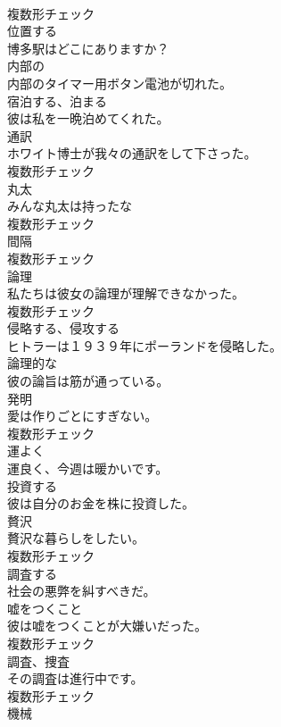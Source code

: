 \documentclass[8pt]{extreport}
\begin{document}
\begin{CJK}{UTF8}{min}
\\	複数形チェック
\\	[動詞]	位置する	
\\	博多駅はどこにありますか？	
\\	[形容詞]	内部の	
\\	内部のタイマー用ボタン電池が切れた。	
\\	[動詞]	宿泊する、泊まる	
\\	彼は私を一晩泊めてくれた。	
\\	[名詞]	通訳	
\\	ホワイト博士が我々の通訳をして下さった。	
\\	複数形チェック
\\	[名詞]	丸太	
\\	みんな丸太は持ったな	
\\	複数形チェック
\\	[名詞]	間隔	
\\	複数形チェック
\\	[名詞]	論理	
\\	私たちは彼女の論理が理解できなかった。	
\\	複数形チェック
\\	[動詞]	侵略する、侵攻する	
\\	ヒトラーは１９３９年にポーランドを侵略した。	
\\	[形容詞]	論理的な	
\\	彼の論旨は筋が通っている。	
\\	[名詞]	発明	
\\	愛は作りごとにすぎない。	
\\	複数形チェック
\\	[副詞]	運よく	
\\	運良く、今週は暖かいです。	
\\	[動詞]	投資する	
\\	彼は自分のお金を株に投資した。	
\\	[名詞]	贅沢	
\\	贅沢な暮らしをしたい。	
\\	複数形チェック
\\	[動詞]	調査する	
\\	社会の悪弊を糾すべきだ。	
\\	[名詞]	嘘をつくこと	
\\	彼は嘘をつくことが大嫌いだった。	
\\	複数形チェック
\\	[名詞]	調査、捜査	
\\	その調査は進行中です。	
\\	複数形チェック
\\	[名詞]	機械	

\end{CJK}
\end{document}
